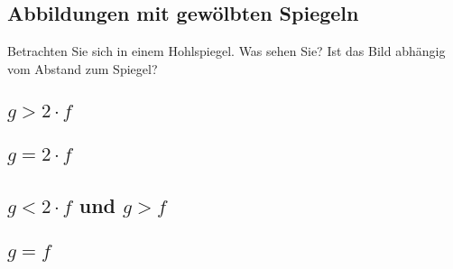 \subsection{Abbildungen mit gewölbten Spiegeln}
\begin{aufgabe}
	Betrachten Sie sich in einem Hohlspiegel. Was sehen Sie? Ist das Bild abhängig vom Abstand zum Spiegel?
\end{aufgabe}

\subsection*{$g>2\cdot f$}
\begin{center}
\end{center}

\subsection*{$g=2\cdot f$}
\begin{center}
\end{center}

\subsection*{$g<2\cdot f$ und $g>f$}
\begin{center}
\end{center}

\subsection*{$g=f$}
\begin{center}
\end{center}

